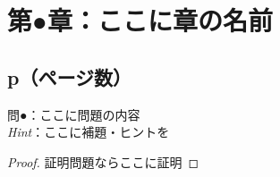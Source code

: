 \documentclass[dvipdfmx,uplatex,11pt]{jsarticle}
\begin{document}
%
%
%
\section{第●章：ここに章の名前}
\subsection{p（ページ数）}
\noindent
問●：ここに問題の内容
\\
\textsl{Hint}：ここに補題・ヒントを\\
\dotfill
%
%
\begin{leftbar}
\begin{proof}
証明問題ならここに証明
\end{proof}
\end{leftbar}
%
%
\end{document}

